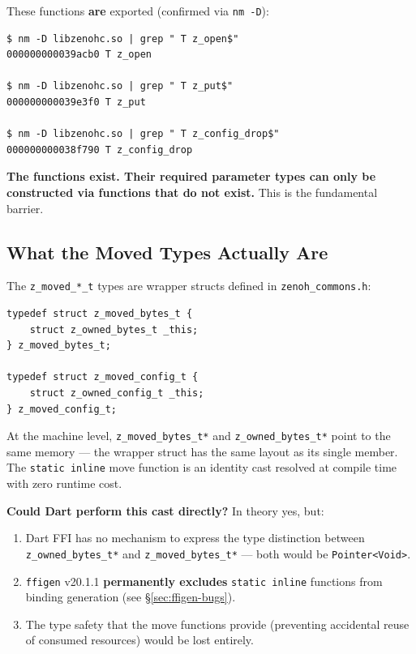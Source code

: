 \documentclass[11pt,a4paper]{article}
\newcommand{\code}[1]{\texttt{#1}}
\newcommand{\file}[1]{\texttt{#1}}
\newcommand{\type}[1]{\texttt{#1}}
\begin{document}
These functions \textbf{are} exported (confirmed via \code{nm -D}):

\begin{lstlisting}[style=shellstyle]
$ nm -D libzenohc.so | grep " T z_open$"
000000000039acb0 T z_open

$ nm -D libzenohc.so | grep " T z_put$"
000000000039e3f0 T z_put

$ nm -D libzenohc.so | grep " T z_config_drop$"
000000000038f790 T z_config_drop
\end{lstlisting}

\begin{patternbox}
\textbf{The functions exist. Their required parameter types can only be
constructed via functions that do not exist.} This is the fundamental barrier.
\end{patternbox}


\subsection{What the Moved Types Actually Are}

The \type{z\_moved\_*\_t} types are wrapper structs defined in
\file{zenoh\_commons.h}:

\begin{lstlisting}[style=cstyle]
typedef struct z_moved_bytes_t {
    struct z_owned_bytes_t _this;
} z_moved_bytes_t;

typedef struct z_moved_config_t {
    struct z_owned_config_t _this;
} z_moved_config_t;
\end{lstlisting}

At the machine level, \type{z\_moved\_bytes\_t*} and
\type{z\_owned\_bytes\_t*} point to the same memory --- the wrapper struct
has the same layout as its single member. The \code{static inline} move
function is an identity cast resolved at compile time with zero runtime cost.

\textbf{Could Dart perform this cast directly?} In theory yes, but:

\begin{enumerate}
  \item Dart FFI has no mechanism to express the type distinction between
        \type{z\_owned\_bytes\_t*} and \type{z\_moved\_bytes\_t*} --- both
        would be \type{Pointer<Void>}.
  \item \code{ffigen} v20.1.1 \textbf{permanently excludes}
        \code{static inline} functions from binding generation
        (see \S\ref{sec:ffigen-bugs}).
  \item The type safety that the move functions provide (preventing
        accidental reuse of consumed resources) would be lost entirely.
\end{enumerate}
\end{document}
